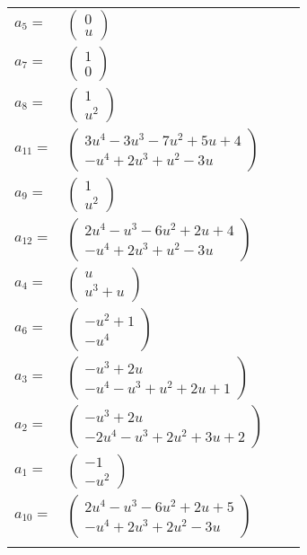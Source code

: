 \documentclass[1p]{elsarticle_modified}
\theoremstyle{definition}
\begin{document}
\begin{tabular}{m{7pt} m{180pt} m{7pt} m{180pt} }
\flushright $a_{5}=$&$\begin{pmatrix}0\\u\end{pmatrix}$ \\
\flushright $a_{7}=$&$\begin{pmatrix}1\\0\end{pmatrix}$ \\
\flushright $a_{8}=$&$\begin{pmatrix}1\\u^2\end{pmatrix}$ \\
\flushright $a_{11}=$&$\begin{pmatrix}3 u^4-3 u^3-7 u^2+5 u+4\\- u^4+2 u^3+u^2-3 u\end{pmatrix}$ \\
\flushright $a_{9}=$&$\begin{pmatrix}1\\u^2\end{pmatrix}$ \\
\flushright $a_{12}=$&$\begin{pmatrix}2 u^4- u^3-6 u^2+2 u+4\\- u^4+2 u^3+u^2-3 u\end{pmatrix}$ \\
\flushright $a_{4}=$&$\begin{pmatrix}u\\u^3+u\end{pmatrix}$ \\
\flushright $a_{6}=$&$\begin{pmatrix}- u^2+1\\- u^4\end{pmatrix}$ \\
\flushright $a_{3}=$&$\begin{pmatrix}- u^3+2 u\\- u^4- u^3+u^2+2 u+1\end{pmatrix}$ \\
\flushright $a_{2}=$&$\begin{pmatrix}- u^3+2 u\\-2 u^4- u^3+2 u^2+3 u+2\end{pmatrix}$ \\
\flushright $a_{1}=$&$\begin{pmatrix}-1\\- u^2\end{pmatrix}$ \\
\flushright $a_{10}=$&$\begin{pmatrix}2 u^4- u^3-6 u^2+2 u+5\\- u^4+2 u^3+2 u^2-3 u\end{pmatrix}$\\&\end{tabular}
\end{document}

